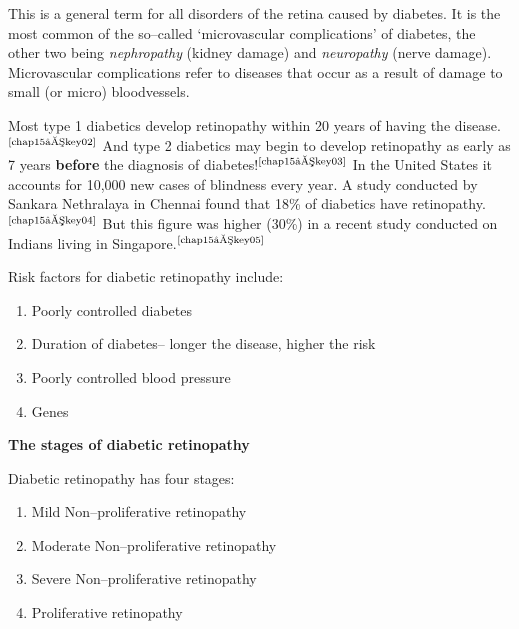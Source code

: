 This is a general term for all disorders of the retina caused by dia\-betes. It is the most common of the so–called ‘microvascular complications’ of diabetes, the other two being \textit{nephropathy} (kidney damage) and \textit{neuropathy} (nerve damage). Microvascular complications refer to diseases that occur as a result of damage to small (or micro) blood\break vessels.

Most type 1 diabetics develop retinopathy within 20 years of having the disease.$^{\text{\cite{chap15–key02}}}$ And type 2 diabetics may begin to develop retinopathy as early as 7 years \textbf{before} the diagnosis of diabetes!$^{\text{\cite{chap15–key03}}}$ In the United States it accounts for 10,000 new cases of blindness every year. A study conducted by Sankara Nethralaya in Chennai found that 18\% of diabetics have retinopathy.$^{\text{\cite{chap15–key04}}}$ But this figure was higher (30\%) in a recent study conducted on Indians living in Singapore.$^{\text{\cite{chap15–key05}}}$

\vskip 8pt
\noindent Risk factors for diabetic retinopathy include:
\begin{enumerate}[•]
\itemsep=0pt
\item Poorly controlled diabetes
\item Duration of diabetes– longer the disease, higher the risk
\item Poorly controlled blood pressure
\item Genes
\end{enumerate}

\noindent\textbf{The stages of diabetic retinopathy}

Diabetic retinopathy has four stages:
\begin{enumerate}
\itemsep=0pt
\item Mild Non–proliferative retinopathy
\item Moderate Non–proliferative retinopathy
\item Severe Non–proliferative retinopathy
\item Proliferative retinopathy
\end{enumerate}

